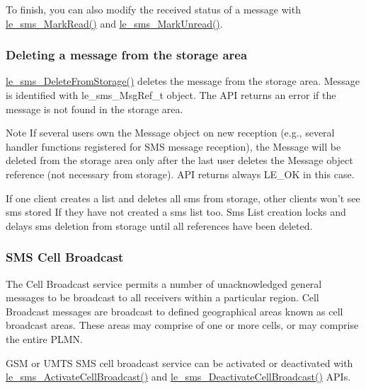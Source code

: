 To finish, you can also modify the received status of a message with {\ttfamily \hyperlink{le__sms__interface_8h_a3dbd11952804520512fed270d183461d}{le\+\_\+sms\+\_\+\+Mark\+Read()}} and {\ttfamily \hyperlink{le__sms__interface_8h_a6ef04e331af6563b79e77bb51b28bc55}{le\+\_\+sms\+\_\+\+Mark\+Unread()}}.\hypertarget{c_sms_le_sms_ops_deleting}{}\subsubsection{Deleting a message from the storage area}\label{c_sms_le_sms_ops_deleting}
{\ttfamily \hyperlink{le__sms__interface_8h_aff755186b683b94ba2788b48e28284a3}{le\+\_\+sms\+\_\+\+Delete\+From\+Storage()}} deletes the message from the storage area. Message is identified with {\ttfamily le\+\_\+sms\+\_\+\+Msg\+Ref\+\_\+t} object. The A\+P\+I returns an error if the message is not found in the storage area.

\begin{DoxyNote}{Note}
If several users own the Message object on new reception (e.\+g., several handler functions registered for S\+M\+S message reception), the Message will be deleted from the storage area only after the last user deletes the Message object reference (not necessary from storage). A\+P\+I returns always L\+E\+\_\+\+O\+K in this case.

If one client creates a list and deletes all sms from storage, other clients won’t see sms stored If they have not created a sms list too. Sms List creation locks and delays sms deletion from storage until all references have been deleted.
\end{DoxyNote}
\hypertarget{c_sms_le_sms_ops_broadcast}{}\subsubsection{S\+M\+S Cell Broadcast}\label{c_sms_le_sms_ops_broadcast}
The Cell Broadcast service permits a number of unacknowledged general messages to be broadcast to all receivers within a particular region. Cell Broadcast messages are broadcast to defined geographical areas known as cell broadcast areas. These areas may comprise of one or more cells, or may comprise the entire P\+L\+M\+N.

G\+S\+M or U\+M\+T\+S S\+M\+S cell broadcast service can be activated or deactivated with \hyperlink{le__sms__interface_8h_a4607c63f325465d078514b5682347c7f}{le\+\_\+sms\+\_\+\+Activate\+Cell\+Broadcast()} and \hyperlink{le__sms__interface_8h_aa57c2f717c71b33e93f278673a7806e9}{le\+\_\+sms\+\_\+\+Deactivate\+Cell\+Broadcast()} A\+P\+Is.

